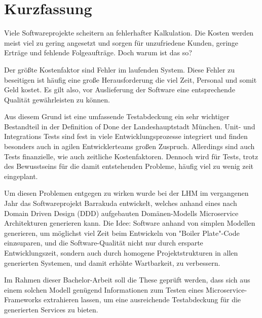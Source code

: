 \documentclass[12pt,a4paper,bibliography=totocnumbered,listof=totocnumbered]{scrartcl}
\begin{document}
\setcounter{page}{1}
\onehalfspacing
{}
\section{Kurzfassung}

Viele Softwareprojekte scheitern an fehlerhafter Kalkulation. Die Kosten werden meist viel zu gering angesetzt und sorgen für unzufriedene Kunden, geringe Erträge und fehlende Folgeaufträge. Doch warum ist das so?

Der größte Kostenfaktor sind Fehler im laufenden System. Diese Fehler zu beseitigen ist häufig eine große Herausforderung die viel Zeit, Personal und somit Geld kostet. Es gilt also, vor Auslieferung der Software eine entsprechende Qualität gewährleisten zu können.

Aus diesem Grund ist eine umfassende Testabdeckung ein sehr wichtiger Bestandteil in der Definition of Done der Landeshauptstadt München. Unit- und Integrations Tests sind fest in viele Entwicklungsprozesse integriert und finden besonders auch in agilen Entwicklerteams großen Zuspruch. Allerdings sind auch Tests finanzielle, wie auch zeitliche Kostenfaktoren.
Dennoch wird für Tests, trotz des Bewusstseins für die damit entstehenden Probleme, häufig viel zu wenig zeit eingeplant.

Um diesen Problemen entgegen zu wirken wurde bei der LHM im vergangenen Jahr das Softwareprojekt Barrakuda entwickelt, welches anhand eines nach Domain Driven Design (DDD) aufgebauten Domänen-Modells Microservice Architekturen generieren kann. Die Idee: Software anhand von simplen Modellen generieren, um möglichst viel Zeit beim Entwickeln von "Boiler Plate"-Code einzsuparen, und die Software-Qualität nicht nur durch ersparte Entwicklungszeit, sondern auch durch homogene Projektstrukturen in allen generierten Systemen, und damit erhöhte Wartbarkeit, zu verbessern.

Im Rahmen dieser Bachelor-Arbeit soll die These geprüft werden, dass sich aus einem solchen Modell genügend Informationen zum Testen eines Microservice-Frameworks extrahieren lassen, um eine ausreichende Testabdeckung für die generierten Services zu bieten.
\end{document}
